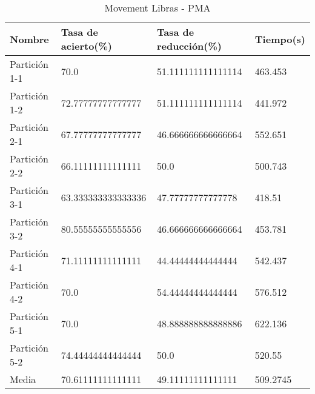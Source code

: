 \begin{table}[H]
	\centering
	\begin{tabular}{l|lll}
		Nombre        & Tasa de acierto(\%) & Tasa de reducción(\%) & Tiempo(s) \\ \hline
		Partición 1-1 & 70.0                & 51.111111111111114    & 463.453   \\
		Partición 1-2 & 72.77777777777777   & 51.111111111111114    & 441.972   \\
		Partición 2-1 & 67.77777777777777   & 46.666666666666664    & 552.651   \\
		Partición 2-2 & 66.11111111111111   & 50.0                  & 500.743   \\
		Partición 3-1 & 63.333333333333336  & 47.77777777777778     & 418.51    \\
		Partición 3-2 & 80.55555555555556   & 46.666666666666664    & 453.781   \\
		Partición 4-1 & 71.11111111111111   & 44.44444444444444     & 542.437   \\
		Partición 4-2 & 70.0                & 54.44444444444444     & 576.512   \\
		Partición 5-1 & 70.0                & 48.888888888888886    & 622.136   \\
		Partición 5-2 & 74.44444444444444   & 50.0                  & 520.55    \\ \hline
		Media         & 70.61111111111111   & 49.11111111111111     & 509.2745
	\end{tabular}
	\caption{Movement Libras - PMA}
	\label{MLIB-PMA}
\end{table}